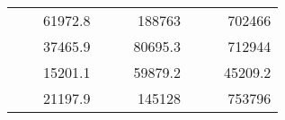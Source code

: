 \begin{table}[H]
\begin{tabular}{|ccrccrccc}
\rowcolor[HTML]{DDFDFF} 
\multicolumn{1}{|c|}{\cellcolor[HTML]{FFFFC7}}                                & \multicolumn{1}{c|}{\cellcolor[HTML]{DDFDFF}}                      & \multicolumn{1}{r|}{\cellcolor[HTML]{DAE8FC}61972.8}   & \multicolumn{1}{c|}{\cellcolor[HTML]{FFFFC7}}                                & \multicolumn{1}{c|}{\cellcolor[HTML]{DDFDFF}}                       & \multicolumn{1}{r|}{\cellcolor[HTML]{DDFDFF}188763}    & \multicolumn{1}{c|}{\cellcolor[HTML]{FFFFC7}}                                & \multicolumn{1}{c|}{\cellcolor[HTML]{DDFDFF}}                      & \multicolumn{1}{r|}{\cellcolor[HTML]{DDFDFF}702466}    \\ \cline{3-3} \cline{6-6} \cline{9-9} 
\multicolumn{1}{|c|}{\cellcolor[HTML]{FFFFC7}}                                & \multicolumn{1}{c|}{\cellcolor[HTML]{DDFDFF}}                      & \multicolumn{1}{r|}{\cellcolor[HTML]{DDFDFF}37465.9}   & \multicolumn{1}{c|}{\cellcolor[HTML]{FFFFC7}}                                & \multicolumn{1}{c|}{\cellcolor[HTML]{DDFDFF}}                       & \multicolumn{1}{r|}{\cellcolor[HTML]{DAE8FC}80695.3}   & \multicolumn{1}{c|}{\cellcolor[HTML]{FFFFC7}}                                & \multicolumn{1}{c|}{\cellcolor[HTML]{DDFDFF}}                      & \multicolumn{1}{r|}{\cellcolor[HTML]{DAE8FC}712944}    \\ \cline{3-3} \cline{6-6} \cline{9-9} 
\rowcolor[HTML]{DDFDFF} 
\multicolumn{1}{|c|}{\cellcolor[HTML]{FFFFC7}}                                & \multicolumn{1}{c|}{\cellcolor[HTML]{DDFDFF}}                      & \multicolumn{1}{r|}{\cellcolor[HTML]{DAE8FC}15201.1}   & \multicolumn{1}{c|}{\cellcolor[HTML]{FFFFC7}}                                & \multicolumn{1}{c|}{\cellcolor[HTML]{DDFDFF}}                       & \multicolumn{1}{r|}{\cellcolor[HTML]{DDFDFF}59879.2}   & \multicolumn{1}{c|}{\cellcolor[HTML]{FFFFC7}}                                & \multicolumn{1}{c|}{\cellcolor[HTML]{DDFDFF}}                      & \multicolumn{1}{r|}{\cellcolor[HTML]{DDFDFF}45209.2}   \\ \cline{3-3} \cline{6-6} \cline{9-9} 
\multicolumn{1}{|c|}{\cellcolor[HTML]{FFFFC7}}                                & \multicolumn{1}{c|}{\cellcolor[HTML]{DDFDFF}}                      & \multicolumn{1}{r|}{\cellcolor[HTML]{DDFDFF}21197.9}   & \multicolumn{1}{c|}{\cellcolor[HTML]{FFFFC7}}                                & \multicolumn{1}{c|}{\cellcolor[HTML]{DDFDFF}}                       & \multicolumn{1}{r|}{\cellcolor[HTML]{DAE8FC}145128}    & \multicolumn{1}{c|}{\cellcolor[HTML]{FFFFC7}}                                & \multicolumn{1}{c|}{\cellcolor[HTML]{DDFDFF}}                      & \multicolumn{1}{r|}{\cellcolor[HTML]{DAE8FC}753796}    \\ \cline{3-3} \cline{6-6} \cline{9-9} 

\end{tabular}
\end{table}
